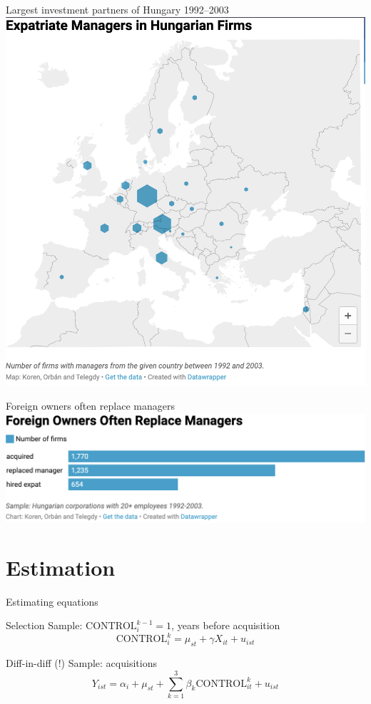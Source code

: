 \documentclass[
  ignorenonframetext,
  aspectratio=43,
]{beamer}
\begin{document}
\begin{frame}{Largest investment partners of Hungary 1992--2003}
\protect\hypertarget{largest-investment-partners-of-hungary-19922003}{}
\includegraphics{figure/map.png}
\end{frame}

\begin{frame}{Foreign owners often replace managers}
\protect\hypertarget{foreign-owners-often-replace-managers}{}
\includegraphics{figure/sample-size.png}
\end{frame}

\hypertarget{estimation}{%
\section{Estimation}\label{estimation}}

\begin{frame}{Estimating equations}
\protect\hypertarget{estimating-equations}{}
\begin{block}{Selection}
\protect\hypertarget{selection}{}
Sample: \(\text{CONTROL}_{i}^{k-1} = 1\), years before acquisition \[
\text{CONTROL}_{i}^k = \mu_{st} + \gamma X_{it}  + u_{ist}
\]
\end{block}

\begin{block}{Diff-in-diff (!)}
\protect\hypertarget{diff-in-diff}{}
Sample: acquisitions \[
Y_{ist} = \alpha_i + \mu_{st} + \sum_{k=1}^3 \beta_k \text{CONTROL}_{it}^k + u_{ist}
\]
\end{block}
\end{frame}
\end{document}
